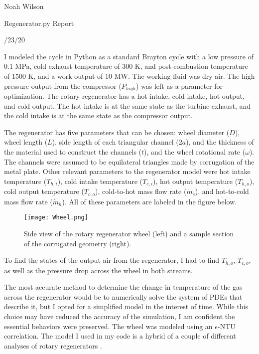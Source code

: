 \documentclass[12pt]{report}
\begin{document}
\noindent Noah Wilson

\noindent Regenerator.py Report

/23/20
\vspace{0.5cm}

I modeled the cycle in Python as a standard Brayton cycle with a low pressure of 0.1 MPa, cold exhaust temperature of 300 K, and post-combustion temperature of 1500 K, and a work output of 10 MW.  The working fluid was dry air.  The high pressure output from the compressor ($P_{high}$) was left as a parameter for optimization.  The rotary regenerator has a hot intake, cold intake, hot output, and cold output.  The hot intake is at the same state as the turbine exhaust, and the cold intake is at the same state as the compressor output. 

 The regenerator has five parameters that can be chosen: wheel diameter ($D$), wheel length ($L$), side length of each triangular channel ($2a$), and the thickness of the material used to construct the channels ($t$), and the wheel rotational rate ($\omega$).  The channels were assumed to be equilateral triangles made by corrugation of the metal plate.  Other relevant parameters to the regenerator model were hot intake temperature ($T_{h,i}$), cold intake temperature ($T_{c,i}$), hot output temperature ($T_{h,o}$), cold output temperature ($T_{c,o}$), cold-to-hot mass flow rate ($\dot{m}_c$), and hot-to-cold mass flow rate ($\dot{m}_h$).  All of these parameters are labeled in the figure below.
\begin{figure}[ht]
	\centering
	\texttt{[image: Wheel.png]}
	\captionsetup{width=\linewidth}
	\caption{Side view of the rotary regenerator wheel (left) and a sample section of the corrugated geometry (right).}
	\label{fig:wheel}
\end{figure} 
To find the states of the output air from the regenerator, I had to find $T_{h,o}$, $T_{c,o}$, as well as the pressure drop across the wheel in both streams.  

The most accurate method to determine the change in temperature of the gas across the regenerator would be to numerically solve the system of PDEs that describe it, but I opted for a simplified model in the interest of time.  While this choice may have reduced the accuracy of the simulation, I am confident the essential behaviors were preserved.  The wheel was modeled using an $\epsilon$-NTU correlation. The model I used in my code is a hybrid of a couple of different analyses of rotary regenerators \cite{abdul06,nelli09}.
\end{document}

